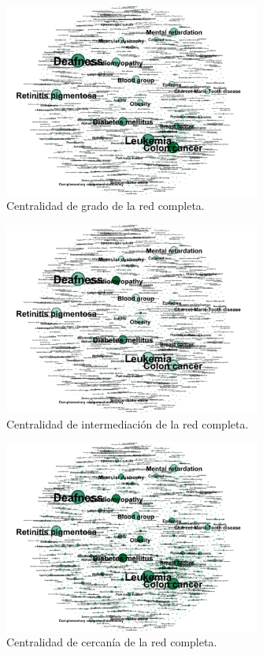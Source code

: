 \documentclass{uimppracticas}
\begin{document}
\begin{figure}[H]
	\centering
	\includegraphics[width=0.75\textwidth]{images/Grado-Centrality}
	\caption{Centralidad de grado de la red completa.}
	\label{Grado-Centrality}
\end{figure}

\begin{figure}[H]
	\centering
	\includegraphics[width=0.75\textwidth]{images/Betweenness-Centrality}
	\caption{Centralidad de intermediación de la red completa.}
	\label{Betweenness-Centrality}
\end{figure}

\begin{figure}[H]
	\centering
	\includegraphics[width=0.75\textwidth]{images/Closeness-Centrality}
	\caption{Centralidad de cercanía de la red completa.}
	\label{Closeness-Centrality}
\end{figure}
\end{document}
